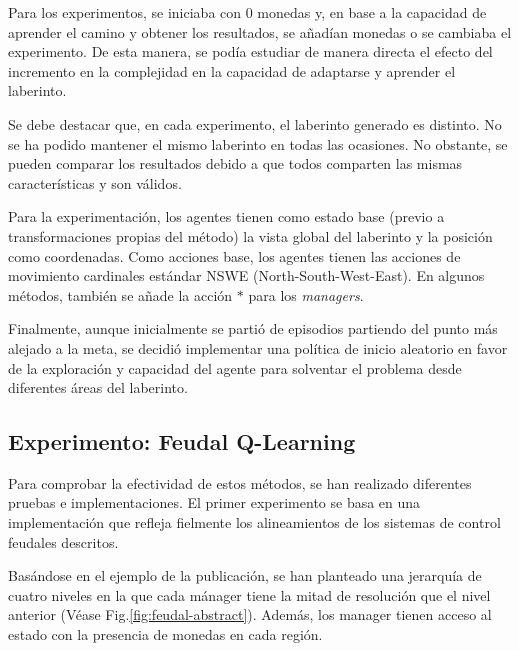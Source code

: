 \documentclass[letterpaper]{article} %
\begin{document}
Para los experimentos, se iniciaba con 0 monedas y, en base a la capacidad de aprender el camino y obtener los resultados, se añadían monedas o se cambiaba el experimento.
De esta manera, se podía estudiar de manera directa el efecto del incremento en la complejidad en la capacidad de adaptarse y aprender el laberinto. 

Se debe destacar que, en cada experimento, el laberinto generado es distinto. No se ha podido mantener el mismo laberinto en todas las ocasiones. No obstante,
se pueden comparar los resultados debido a que todos comparten las mismas características y son válidos.

Para la experimentación, los agentes tienen como estado base (previo a transformaciones propias del método) la vista global del laberinto y la posición como coordenadas. 
Como acciones base, los agentes tienen las acciones de movimiento cardinales estándar NSWE (North-South-West-East). En algunos métodos, 
también se añade la acción $*$ para los \textit{managers}.

Finalmente, aunque inicialmente se partió de episodios partiendo del punto más alejado a la meta, se decidió implementar una política de inicio aleatorio en favor de la exploración y capacidad del agente para solventar el problema desde diferentes áreas del laberinto.

\subsection{Experimento: Feudal Q-Learning}
Para comprobar la efectividad de estos métodos, se han realizado diferentes pruebas e implementaciones. El primer experimento
se basa en una implementación que refleja fielmente los alineamientos de los sistemas de control feudales descritos. 

Basándose en el ejemplo de la publicación, se han planteado una jerarquía de cuatro niveles en la que cada mánager tiene la mitad de resolución 
que el nivel anterior (Véase Fig.\ref{fig:feudal-abstract}). Además, los manager tienen acceso al estado con la presencia de monedas en cada región.  
\end{document}
